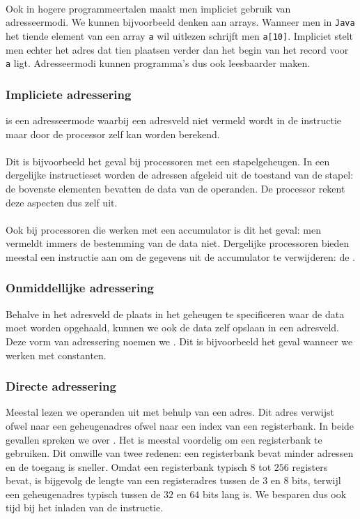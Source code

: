\paragraph{}
Ook in hogere programmeertalen maakt men impliciet gebruik van adresseermodi. We kunnen bijvoorbeeld denken aan arrays. Wanneer men in \verb+Java+ het tiende element van een array \verb+a+ wil uitlezen schrijft men \verb+a[10]+. Impliciet stelt men echter het adres dat tien plaatsen verder dan het begin van het record voor \verb+a+ ligt. Adresseermodi kunnen programma's dus ook leesbaarder maken.
\subsubsection{Impliciete adressering}
 is een adresseermode waarbij een adresveld niet vermeld wordt in de instructie maar door de processor zelf kan worden berekend.
\paragraph{}
Dit is bijvoorbeeld het geval bij processoren met een stapelgeheugen. In een dergelijke instructieset worden de adressen afgeleid uit de toestand van de stapel: de bovenste elementen bevatten de data van de operanden. De processor rekent deze aspecten dus zelf uit.
\paragraph{}
Ook bij processoren die werken met een accumulator is dit het geval: men vermeldt immers de bestemming van de data niet. Dergelijke processoren bieden meestal een instructie aan om de gegevens uit de accumulator te verwijderen: de .
\subsubsection{Onmiddellijke adressering}
Behalve in het adresveld de plaats in het geheugen te specificeren waar de data moet worden opgehaald, kunnen we ook de data zelf opslaan in een adresveld. Deze vorm van adressering noemen we . Dit is bijvoorbeeld het geval wanneer we werken met constanten.
\subsubsection{Directe adressering}
Meestal lezen we operanden uit met behulp van een adres. Dit adres verwijst ofwel naar een geheugenadres ofwel naar een index van een registerbank. In beide gevallen spreken we over . Het is meestal voordelig om een registerbank te gebruiken. Dit omwille van twee redenen: een registerbank bevat minder adressen en de toegang is sneller. Omdat een registerbank typisch $8$ tot $256$ registers bevat, is bijgevolg de lengte van een registeradres tussen de $3$ en $8$ bits, terwijl een geheugenadres typisch tussen de $32$ en $64$ bits lang is. We besparen dus ook tijd bij het inladen van de instructie.
